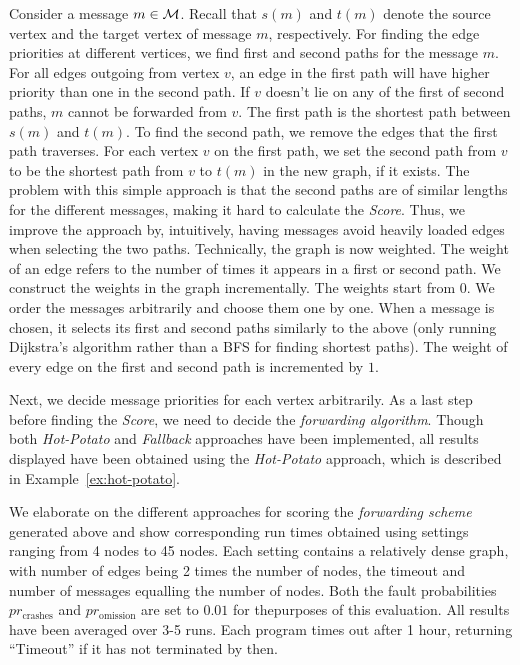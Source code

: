 \documentclass[11pt,eepic]{article}
\newcommand{\M}{{\cal M}}
\begin{document}
		Consider a message $m \in \M$. Recall that $s(m)$ and $t(m)$ denote the source vertex
		and the target vertex of message $m$, respectively. For finding the edge priorities at different vertices, we find first and second paths for the message $m$. For all edges outgoing from vertex $v$, an edge in the first path will have higher priority than one in the second path. If $v$ doesn't lie on any of the first of second paths, $m$ cannot be forwarded from $v$.
		The first path is the shortest path between $s(m)$ and $t(m)$.
		To find the second path, we remove the edges that the first path traverses.
		For each vertex $v$ on the first path,
		we set the second path from $v$ to be the shortest path from $v$ to $t(m)$ in the new graph, if it exists. 
		The problem with this simple approach is that the second paths are of similar lengths for the different messages, making it hard to calculate the {\em Score}. Thus, we improve the approach by, intuitively, having messages avoid heavily loaded edges when selecting the two paths. Technically, the graph is now weighted. The weight of an edge refers to the number of times it appears in a first or second path. We construct the weights in the graph incrementally. The weights start from $0$. We order the messages arbitrarily and choose them one by one. When a message is chosen, it selects its first and second paths similarly to the above (only running Dijkstra's algorithm rather than a BFS for finding shortest paths). The weight of every edge on the first and second path is incremented by $1$.

		Next, we decide message priorities for each vertex arbitrarily.
		As a last step before finding the {\em Score}, we need to decide the {\em forwarding algorithm}. Though both {\em Hot-Potato} and {\em Fallback} approaches have been implemented, all results displayed have been obtained using the {\em Hot-Potato} approach, which is described in Example~\ref{ex:hot-potato}. 

		We elaborate on the different approaches for scoring the {\em forwarding scheme} generated above and show corresponding run times obtained using settings ranging from 4 nodes to 45 nodes. Each setting contains a relatively dense graph, with number of edges being 2 times the number of nodes, the timeout and number of messages equalling the number of nodes. Both the fault probabilities $pr_{\text{crashes}}$ and $pr_{\text{omission}}$ are set to $0.01$ for thepurposes of this evaluation. All results have been averaged over 3-5 runs. Each program times out after 1 hour, returning ``Timeout'' if it has not terminated by then.
\end{document}
